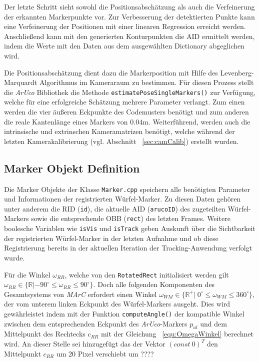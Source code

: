  Der letzte Schritt sieht sowohl die Positionsabschätzung als auch die Verfeinerung der erkannten Markerpunkte vor. Zur Verbesserung der detektierten Punkte kann eine Verfeinerung der Positionen mit einer linearen Regression erreicht werden. Anschließend kann mit den generierten Konturpunkten die AID ermittelt werden, indem die Werte mit den Daten aus dem ausgewählten Dictionary abgeglichen wird.

 Die Positionsabschätzung dient dazu die Markerposition mit Hilfe des Levenberg-Marquardt Algorithmus \cite{article:Levenberg} im Kameraraum zu bestimmen. Für diesen Prozess stellt die \textit{ArUco} Bibliothek die Methode \texttt{esti\-mate\-Pose\-Single\-Markers()} zur Verfügung, welche für eine erfolgreiche Schätzung mehrere Parameter verlangt. Zum einen werden die vier äußeren Eckpunkte des Codemusters benötigt und zum anderen die reale Kantenlänge eines Markers von $0.04$m. Weiterführend, werden auch die intrinsische und extrinschen Kameramatrizen benötigt, welche während der letzten Kamerakalibrierung (vgl. Abschnitt ~\ref{sec:camCalib}) erstellt wurden.

 
\subsection{Marker Objekt Definition}\label{sec:MarkerObjekte}
Die Marker Objekte der Klasse \texttt{Marker.cpp} speichern alle benötigten Parameter und Informationen der registrierten Würfel-Marker. Zu diesen Daten gehören unter anderem die RID (\texttt{id}), die aktuelle AID (\texttt{arucoID}) des zugeteilten Würfel-Markers sowie die entsprechende OBB (\texttt{rect}) des letzten Frames. Weitere boolesche Variablen wie \texttt{isVis} und \texttt{isTrack} geben Auskunft über die Sichtbarkeit der registrierten Würfel-Marker in der letzten Aufnahme und ob diese Registrierung bereits in der aktuellen Iteration der Tracking-Anwendung verfolgt wurde.

Für die Winkel $\omega_{RR}$, welche von den \texttt{Rotated\-Rect} initialisiert werden gilt $\omega_{RR} \in \{\mathbb{R} | -90^\circ \le \omega_{RR} \le 90^\circ\}$. Doch alle folgenden Komponenten des Gesamtsystems von \textit{MArC} erfordert einen Winkel $\omega_{WM} \in \{\mathbb{R}^+ |\ 0 ^\circ \le \omega_{WM} \le 360^\circ\}$, der vom unterem linken Eckpunkt des Würfel-Markers ausgeht. Dies wird gewährleistet indem mit der Funktion \texttt{compute\-Angle()} der kompatible Winkel zwischen dem entsprechenden Eckpunkt des \textit{ArUco}-Markers $p_{ul}$ und dem Mittelpunkt des Rechtecks $c_{RR}$ mit der Gleichung ~\ref{equ:OmegaWinkel} berechnet wird. An dieser Stelle sei hinzugefügt das der Vektor $(const \ 0 )^T$ den Mittelpunkt $c_{RR}$ um $20$ Pixel verschiebt um ????

